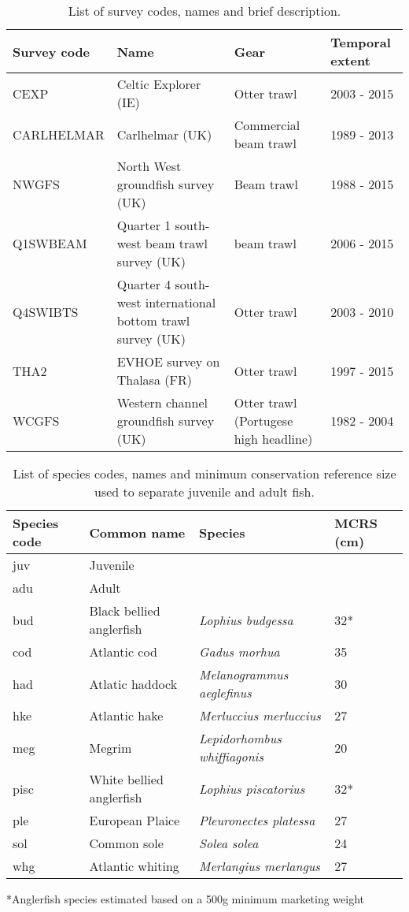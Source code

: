 \documentclass{article}
\begin{document}
\begin{table}[!ht]
	\caption{List of survey codes, names and brief description.}
	\center
	\begin{tabular}{ p{3cm} p{4cm} p{4cm} p{3cm} }
		\hline
		Survey code    & Name 	& Gear & Temporal extent \\
		\hline
		CEXP           & Celtic Explorer (IE)   & Otter trawl & 2003 - 2015 \\
		CARLHELMAR     & Carlhelmar (UK)	& Commercial beam trawl & 1989 - 2013 \\
		NWGFS          & North West groundfish survey (UK) & Beam trawl & 1988 - 2015 \\
		Q1SWBEAM       & Quarter 1 south-west beam trawl survey (UK) 	& beam trawl & 2006 - 2015 \\
		Q4SWIBTS       & Quarter 4 south-west international bottom trawl survey (UK) & Otter trawl & 2003 - 2010 \\
		THA2           & EVHOE survey on Thalasa (FR) & Otter trawl & 1997 - 2015 \\
		WCGFS          & Western channel groundfish survey (UK) & Otter
		trawl (Portugese high headline) & 1982 - 2004 \\
		\hline
	\end{tabular}
\end{table}


\begin{table}[!ht]
	\caption{List of species codes, names and minimum conservation
		reference size used to separate juvenile and adult fish.}
	\center
	\begin{tabular}{ p{3cm} p{4cm} p{6cm} p{2cm} }
		\hline
		Species code & Common name              & Species & MCRS (cm) \\
		\hline
		juv          & Juvenile                 & \\
		adu          & Adult                    & \\
		\hline
		bud          & Black bellied anglerfish & \textit{Lophius
			budgessa} &  32* \\
		cod          & Atlantic cod             & \textit{Gadus morhua}
		& 35 \\
		had          & Atlatic haddock          & \textit{Melanogrammus
			aeglefinus} & 30 \\
		hke          & Atlantic hake            & \textit{Merluccius
			merluccius} & 27 \\
		meg          & Megrim                   & \textit{Lepidorhombus
			whiffiagonis} & 20 \\
		pisc         & White bellied anglerfish & \textit{Lophius
			piscatorius}	& 32* \\
		ple          & European Plaice          & \textit{Pleuronectes
			platessa} & 27 \\
		sol          & Common sole              & \textit{Solea solea}
		& 24 \\
		whg          & Atlantic whiting         & \textit{Merlangius
			merlangus} & 27 \\
		\hline
	\end{tabular}
	*Anglerfish species estimated based on a 500g minimum marketing weight

\end{table}
\end{document}
